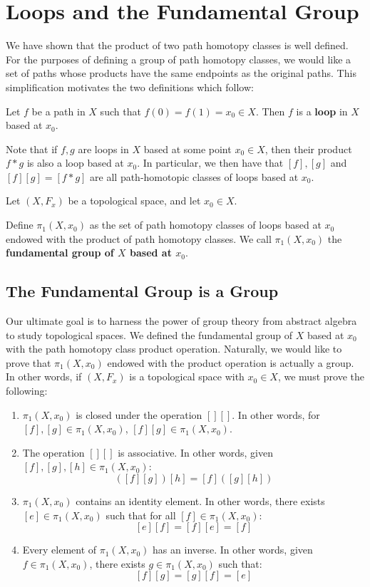 

\section{Loops and the Fundamental Group} We have shown that the product of two path homotopy classes is well defined. For the purposes of defining a group of path homotopy classes, we would like a set of paths whose products have the same endpoints as the original paths. This simplification motivates the two definitions which follow: 
\begin{definition}
	Let $f$ be a path in $X$ such that $f(0) = f(1) = x_0\in X$. Then $f$ is a \textbf{loop} in $X$ based at $x_0$. 
\end{definition}

Note that if $f,g$ are loops in $X$ based at some point $x_0\in X$, then their product $f*g$ is also a loop based at $x_0$. In particular, we then have that $[f],[g]$ and $[f][g] = [f*g]$ are all path-homotopic classes of loops based at $x_0$. 
\begin{definition}
	Let $(X,F_x)$ be a topological space, and let $x_0\in X$. 
	
	Define $\pi_1(X,x_0)$ as the set of path homotopy classes of loops based at $x_0$ endowed with the product of path homotopy classes. We call $\pi_1(X,x_0)$ the \textbf{fundamental group of $X$ based at $x_0$}. 
\end{definition}

\subsection{The Fundamental Group is a Group}

Our ultimate goal is to harness the power of group theory from abstract algebra to study topological spaces. We defined the fundamental group of $X$ based at $x_0$ with the path homotopy class product operation. Naturally, we would like to prove that $\pi_1(X,x_0)$ endowed with the product operation is actually a group. In other words, if $(X,F_x)$ is a topological space with $x_0\in X$, we must prove the following: 
\begin{enumerate}
	\item $\pi_1(X,x_0)$ is closed under the operation $[][]$. In other words, for $[f],[g]\in \pi_1(X,x_0)$, $[f][g] \in \pi_1(X,x_0)$. 
	\item The operation $[][]$ is associative. In other words, given $[f],[g],[h]\in \pi_1(X,x_0)$:
	\[ ([f][g])[h] = [f]([g][h])\]
	\item $\pi_1(X,x_0)$ contains an identity element. In other words, there exists $[e]\in \pi_1(X,x_0)$ such that for all $[f]\in\pi_1(X,x_0)$:
	\[[e][f] = [f][e] = [f]\]
	\item Every element of $\pi_1(X,x_0)$ has an inverse. In other words, given $f\in \pi_1(X,x_0)$, there exists $g\in \pi_1(X,x_0)$ such that:
	\[[f][g] = [g][f] = [e]\]
\end{enumerate}

